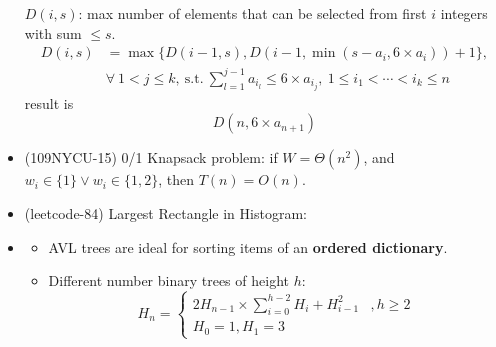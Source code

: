 \begin{itemize}
    $D(i, s)$: max number of elements that can be selected from first $i$ integers with sum $\le s$. \begin{equation}
        \begin{aligned}
            D(i, s) & = \max\{D(i - 1, s), D(i - 1, \min(s - a_i, 6 \times a_i)) + 1\}, \\
            & \forall \ 1 < j \le k, \ \text{s.t.} \ \sum_{l = 1}^{j - 1}a_{i_l} \le 6 \times a_{i_j}, \ 1 \le i_1 < \cdots < i_k \le n
        \end{aligned}
    \end{equation} result is \begin{equation}
        D(n, 6 \times a_{n + 1})
    \end{equation}
    \item (109NYCU-15) 0/1 Knapsack problem: if $W = \Theta(n^2)$, and $w_i \in \{1\} \lor w_i \in \{1, 2\}$, then $T(n) = O(n)$.
    \item (leetcode-84) Largest Rectangle in Histogram: 
    \item \begin{itemize}
        \item AVL trees are ideal for sorting items of an \textbf{ordered dictionary}.
        \item Different number binary trees of height $h$: \begin{equation}
            H_n = \begin{cases}
                2H_{n - 1} \times \sum\limits_{i = 0}^{h - 2}H_i + H_{i - 1}^2 &, h \ge 2\\
                H_0 = 1, H_1 = 3 
            \end{cases}
        \end{equation}
    \end{itemize}
\end{itemize}

\pagebreak
